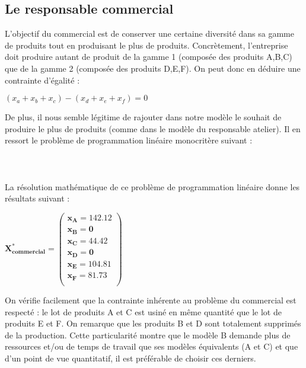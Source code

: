 \documentclass[12pt]{article}
\begin{document}
\subsection{Le responsable commercial}
L'objectif du commercial est de conserver une certaine diversité dans sa gamme de produits tout en produisant le plus de produits. Concrètement, l’entreprise doit produire autant de produit de la gamme 1 (composée des produits A,B,C) que de la gamme 2 (composée des produits D,E,F).
On peut donc en déduire une contrainte d’égalité :\begin{center} $(x_{a} + x_{b} + x_{c}) - (x_{d} + x_{e} + x_{f}) = 0$ \end{center}

De plus, il nous semble légitime de rajouter dans notre modèle le souhait de produire le plus de produits (comme dans le modèle du responsable atelier).
Il en ressort le problème de programmation linéaire monocritère suivant :\\
\\
\noindent{}
\\
\\
La résolution mathématique de ce problème de programmation linéaire donne les résultats suivant :\\
\begin{center}
$\mathbf{X^{*}_{commercial} = 
   \left (
   \begin{array}{c}
      x_{A} = 142.12 \\
      x_{B} = 0 \\
      x_{C} = 44.42 \\
      x_{D} = 0 \\
      x_{E} = 104.81 \\
      x_{F} = 81.73 \\
   \end{array}
   \right )
 } $ 
\end{center}
On vérifie facilement que la contrainte inhérente au problème du commercial est respecté : le lot de produits A et C est usiné en même quantité que le lot de produits E et F.
On remarque que les produits B et D sont totalement supprimés de la production. Cette particularité montre que le modèle B demande plus de ressources et/ou de temps de travail que ses modèles équivalents (A et C) et que d'un point de vue quantitatif, il est préférable de choisir ces derniers. 
\end{document}
